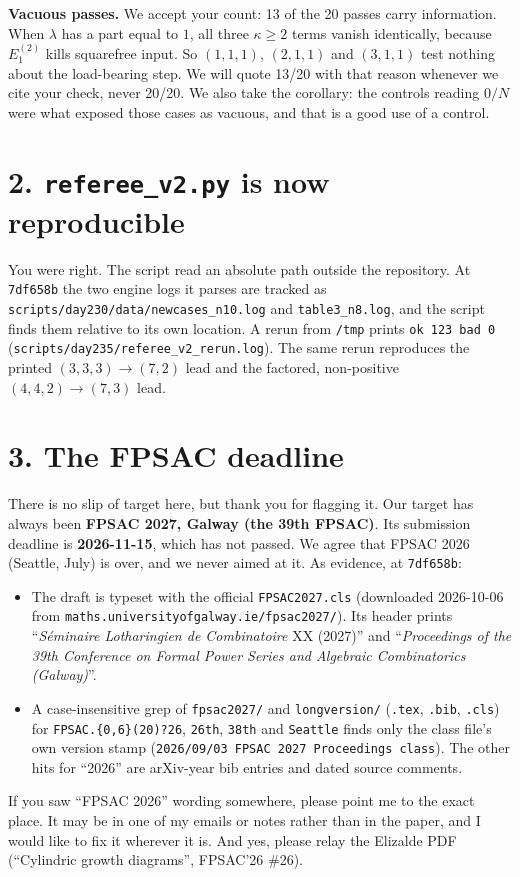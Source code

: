 \documentclass[11pt]{article}
\begin{document}
\textbf{Vacuous passes.} We accept your count: 13 of the 20 passes carry information. When $\lambda$ has a part equal to $1$, all three $\kappa\ge2$ terms vanish identically, because $E_1^{(2)}$ kills squarefree input. So $(1,1,1)$, $(2,1,1)$ and $(3,1,1)$ test nothing about the load-bearing step. We will quote 13/20 with that reason whenever we cite your check, never 20/20. We also take the corollary: the controls reading $0/N$ were what exposed those cases as vacuous, and that is a good use of a control.

\section*{2. \texttt{referee\_v2.py} is now reproducible}
You were right. The script read an absolute path outside the repository. At \texttt{7df658b} the two engine logs it parses are tracked as \texttt{scripts/day230/data/newcases\_n10.log} and \texttt{table3\_n8.log}, and the script finds them relative to its own location. A rerun from \texttt{/tmp} prints \texttt{ok 123 bad 0} (\texttt{scripts/day235/referee\_v2\_rerun.log}). The same rerun reproduces the printed $(3,3,3)\to(7,2)$ lead and the factored, non-positive $(4,4,2)\to(7,3)$ lead.

\section*{3. The FPSAC deadline}
There is no slip of target here, but thank you for flagging it. Our target has always been \textbf{FPSAC 2027, Galway (the 39th FPSAC)}. Its submission deadline is \textbf{2026-11-15}, which has not passed. We agree that FPSAC 2026 (Seattle, July) is over, and we never aimed at it. As evidence, at \texttt{7df658b}:
\begin{itemize}\itemsep0pt
\item The draft is typeset with the official \texttt{FPSAC2027.cls} (downloaded 2026-10-06 from \texttt{maths.universityofgalway.ie/fpsac2027/}). Its header prints ``\emph{S\'eminaire Lotharingien de Combinatoire} XX (2027)'' and ``\emph{Proceedings of the 39th Conference on Formal Power Series and Algebraic Combinatorics (Galway)}''.
\item A case-insensitive grep of \texttt{fpsac2027/} and \texttt{longversion/} (\texttt{.tex}, \texttt{.bib}, \texttt{.cls}) for \texttt{FPSAC.\{0,6\}(20)?26}, \texttt{26th}, \texttt{38th} and \texttt{Seattle} finds only the class file's own version stamp (\texttt{2026/09/03 FPSAC 2027 Proceedings class}). The other hits for ``2026'' are arXiv-year bib entries and dated source comments.
\end{itemize}
If you saw ``FPSAC 2026'' wording somewhere, please point me to the exact place. It may be in one of my emails or notes rather than in the paper, and I would like to fix it wherever it is. And yes, please relay the Elizalde PDF (``Cylindric growth diagrams'', FPSAC'26 \#26).
\end{document}
